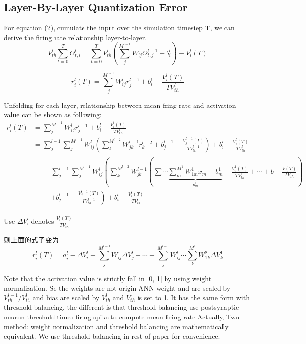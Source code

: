 \documentclass{article}
\begin{document}
\subsection{Layer-By-Layer Quantization Error}

For equation (2), cumulate the input over the simulation timestep T, we can derive the firing rate relationship layer-to-layer.
\begin{equation}
  V_{th}^l\sum_{t=0}^T\Theta_{t,i}^{l}=\sum_{t=0}^TV_{th}^l\left(\sum_j^{M^{l-1}}W_{ij}^l\Theta_{t,j}^{l-1}+b_i^l\right) - V_i^l(T)
\end{equation}


\begin{equation}
  r_i^l(T) = \sum_j^{M^{l-1}}W_{ij}^lr_j^{l-1}+b_i^l - \frac{V_i^l(T)}{TV_{th}^{l}}
\end{equation}

Unfolding for each layer, relationship between mean fring rate and activation value can be shown as following:
\begin{equation}
  \begin{aligned}
    r_i^l(T) &=\sum_j^{M^{l-1}}W_{ij}^lr_j^{l-1}+b_i^l - \frac{V_i^l(T)}{TV_{th}^{l}} \\
    &=\sum_j^{l-1} \sum_j^{M^{l-1}}W_{ij}^l\left(\sum_k^{M^{l-2}}W_{jk}^{l-1}r_k^{l-2}+b_j^{l-1} - \frac{V_j^{l-1}(T)}{TV_{th}^{l-1}} \right) + b_i^l - \frac{V_i^{l}(T)}{TV_{th}^{l}}\\
    &= \begin{split}
        &\sum_j^{l-1} \sum_j^{M^{l-1}}W_{ij}^l\left(\sum_k^{M^{l-2}}W_{jk}^{l-1}\left(\sum\cdots \underbrace{\sum_m^{M^{1}}W_{1m}^1x_m+b_m^1}_{a_m^1} - \frac{V_i^1(T)}{TV_{th}^{1}} + \cdots + b - \frac{V(T)}{TV_{th}} \right) \right.\\ 
        &\left. + b_j^{l-1} - \frac{V_j^{l-1}(T)}{TV_{th}^{l-1}} \right) + b_i^l - \frac{V_i^{l}(T)}{TV_{th}^l}
    \end{split}
\end{aligned}
\end{equation}

Use $\Delta V_i^l$ denotes $\frac{V_i^{l}(T)}{TV_{th}^l}$

则上面的式子变为
\begin{equation}
    r_i^l(T) = a_i^l - \Delta V_i^l - \sum_j^{M^{l-1}}W_{ij}\Delta V_j^l - \cdots -\sum_j^{M^{l-1}}W_{ij}^l \cdots \sum_k^{M^{1}}W_{1k}^2 \Delta V_k^1
\end{equation}

Note that the activation value is strictly fall in [0, 1] by using weight normalization.
So the weights are not origin ANN weight and are scaled by $V_{th}^{l-1}/V_{th}^l$ and bias are scaled by $V_{th}^l$ and $V_{th}$ is set to 1.
It has the same form with threshold balancing, the different is that threshold balancing use postsynaptic neuron threshold times firing spike to compute mean firing rate
Actually, Two method: weight normalization and threshold balancing are mathematically equivalent. We use threshold balancing in rest of paper for convenience.
\end{document}
